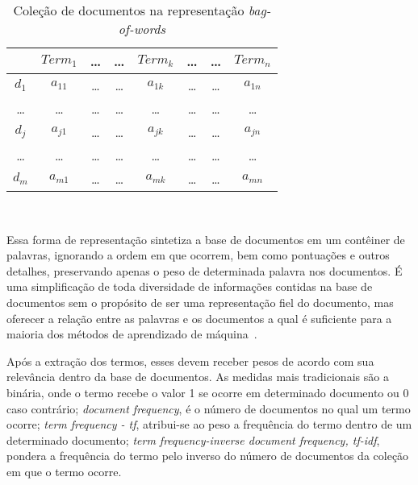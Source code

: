 \begin{table}[!h]
	\centering

	\begin{tabular}{c|c|c|c|c|c|c|c}


	& $Term_1$ & \dots & \dots & $Term_k$ & \dots & \dots & $Term_n$ \\ \hline \hline
	$d_1$ & $a_{11}$ & \dots & \dots & $a_{1k}$ & \dots & \dots & $a_{1n}$   \\ \hline 
	\dots & \dots    & \dots & \dots & \dots    & \dots & \dots & \dots      \\ \hline 
	$d_j$ & $a_{j1}$ & \dots & \dots & $a_{jk}$ & \dots & \dots & $a_{jn}$   \\ \hline 
	\dots & \dots    & \dots & \dots & \dots    & \dots & \dots & \dots      \\ \hline 
	$d_m$ & $a_{m1}$ & \dots & \dots & $a_{mk}$ & \dots & \dots & $a_{mn}$   \\ 

	\end{tabular}
	\caption{Coleção de documentos na representação \textit{bag-of-words}}
	\label{table:bagofwords}\\ 
\end{table}



Essa forma de representação sintetiza a base de documentos em um contêiner de palavras, ignorando a ordem em que ocorrem, bem como pontuações e outros detalhes, preservando apenas o peso de determinada palavra nos documentos.	É uma simplificação de toda diversidade de informações contidas na base de documentos sem o propósito de ser uma representação fiel do documento, mas oferecer a relação entre as palavras e os documentos a qual é suficiente para a maioria dos métodos de aprendizado de máquina~\cite{Rezende2003}. 



Após a extração dos termos, esses devem receber pesos de acordo com sua relevância dentro da base de documentos. As medidas mais tradicionais são a binária, onde o termo recebe o valor 1 se ocorre em determinado documento ou 0 caso contrário; \textit{document frequency}, é o número de documentos no qual um termo ocorre; \textit{term frequency - tf}, atribui-se ao peso a frequência do termo dentro de um determinado documento; \textit{term frequency-inverse document frequency, tf-idf}, pondera a frequência do termo pelo inverso do número de documentos da coleção em que o termo ocorre.


